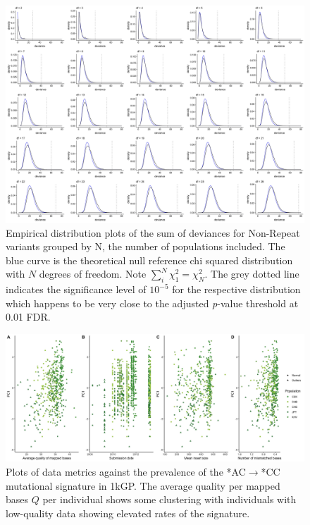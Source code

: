 \documentclass[9pt,lineno]{elife}
\begin{document}
\begin{figure}[h]
\includegraphics[width=\hsize,keepaspectratio]{./Figures/AllDeviances.jpg}

\caption{Empirical distribution plots of the sum of deviances for Non-Repeat variants grouped by N, the number of populations included. The blue curve is the theoretical null reference chi squared distribution with $N$ degrees of freedom. Note $\sum_i^N  \chi^2_1= \chi^2_N$. The grey dotted line indicates the significance level of $10^{-5}$ for the respective distribution which happens to be very close to the adjusted \textit{p}-value threshold at 0.01 FDR. }
\label{Deviances}
\end{figure}

\begin{figure}[h]
\includegraphics[width=\hsize,keepaspectratio]{./Figures/PC1_Correlation.jpg}
\caption{Plots of data metrics against the prevalence of the  *AC${\rightarrow}$*CC mutational signature in 1kGP. The average quality per mapped bases $Q$ per individual shows some clustering with individuals with low-quality data showing elevated rates of the signature.  }
\label{PC1_Correlation}
\end{figure}
\end{document}
